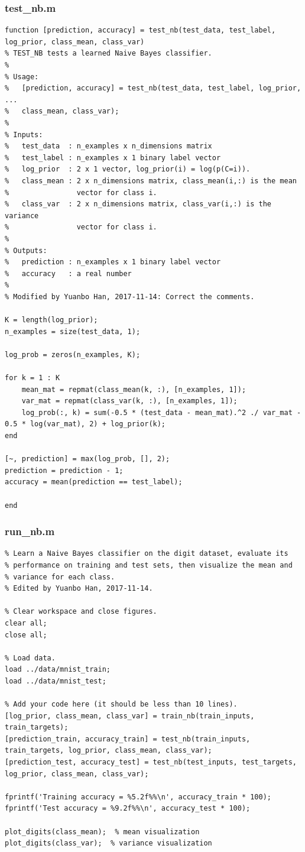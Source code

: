 \documentclass{article}
\begin{document}
\subsubsection{test\_nb.m}
\begin{lstlisting}
function [prediction, accuracy] = test_nb(test_data, test_label, log_prior, class_mean, class_var)
% TEST_NB tests a learned Naive Bayes classifier.
%
% Usage:
%   [prediction, accuracy] = test_nb(test_data, test_label, log_prior, ...
%   class_mean, class_var);
%
% Inputs:
%   test_data  : n_examples x n_dimensions matrix
%   test_label : n_examples x 1 binary label vector
%   log_prior  : 2 x 1 vector, log_prior(i) = log(p(C=i)).
%   class_mean : 2 x n_dimensions matrix, class_mean(i,:) is the mean
%                vector for class i.
%   class_var  : 2 x n_dimensions matrix, class_var(i,:) is the variance
%                vector for class i.
%
% Outputs:
%   prediction : n_examples x 1 binary label vector
%   accuracy   : a real number
%
% Modified by Yuanbo Han, 2017-11-14: Correct the comments.

K = length(log_prior);
n_examples = size(test_data, 1);

log_prob = zeros(n_examples, K);

for k = 1 : K
    mean_mat = repmat(class_mean(k, :), [n_examples, 1]);
    var_mat = repmat(class_var(k, :), [n_examples, 1]);
    log_prob(:, k) = sum(-0.5 * (test_data - mean_mat).^2 ./ var_mat - 0.5 * log(var_mat), 2) + log_prior(k);
end

[~, prediction] = max(log_prob, [], 2);
prediction = prediction - 1;
accuracy = mean(prediction == test_label);

end
\end{lstlisting}

\subsubsection{run\_nb.m}
\begin{lstlisting}
% Learn a Naive Bayes classifier on the digit dataset, evaluate its
% performance on training and test sets, then visualize the mean and
% variance for each class.
% Edited by Yuanbo Han, 2017-11-14.

% Clear workspace and close figures.
clear all;
close all;

% Load data.
load ../data/mnist_train;
load ../data/mnist_test;

% Add your code here (it should be less than 10 lines).
[log_prior, class_mean, class_var] = train_nb(train_inputs, train_targets);
[prediction_train, accuracy_train] = test_nb(train_inputs, train_targets, log_prior, class_mean, class_var);
[prediction_test, accuracy_test] = test_nb(test_inputs, test_targets, log_prior, class_mean, class_var);

fprintf('Training accuracy = %5.2f%%\n', accuracy_train * 100);
fprintf('Test accuracy = %9.2f%%\n', accuracy_test * 100);

plot_digits(class_mean);  % mean visualization
plot_digits(class_var);  % variance visualization
\end{lstlisting}
\end{document}
